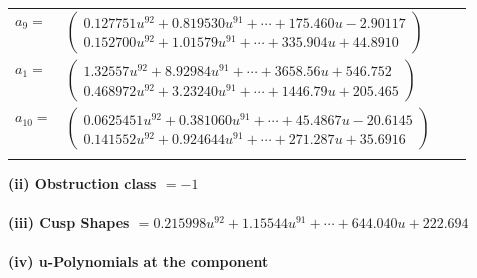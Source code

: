 \documentclass[1p]{elsarticle_modified}
\theoremstyle{definition}
\begin{document}
\begin{tabular}{m{7pt} m{180pt} m{7pt} m{180pt} }
\flushright $a_{9}=$&$\begin{pmatrix}0.127751 u^{92}+0.819530 u^{91}+\cdots+175.460 u-2.90117\\0.152700 u^{92}+1.01579 u^{91}+\cdots+335.904 u+44.8910\end{pmatrix}$ \\
\flushright $a_{1}=$&$\begin{pmatrix}1.32557 u^{92}+8.92984 u^{91}+\cdots+3658.56 u+546.752\\0.468972 u^{92}+3.23240 u^{91}+\cdots+1446.79 u+205.465\end{pmatrix}$ \\
\flushright $a_{10}=$&$\begin{pmatrix}0.0625451 u^{92}+0.381060 u^{91}+\cdots+45.4867 u-20.6145\\0.141552 u^{92}+0.924644 u^{91}+\cdots+271.287 u+35.6916\end{pmatrix}$\\&\end{tabular}
\flushleft \textbf{(ii) Obstruction class $= -1$}\\~\\
\flushleft \textbf{(iii) Cusp Shapes $= 0.215998 u^{92}+1.15544 u^{91}+\cdots+644.040 u+222.694$}\\~\\
\newpage\renewcommand{\arraystretch}{1}
\flushleft \textbf{(iv) u-Polynomials at the component}\newline \\
\end{document}
